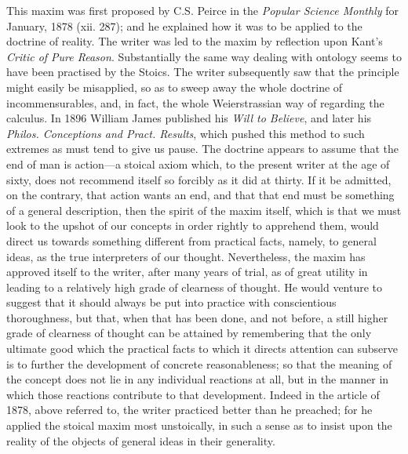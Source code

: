 \documentclass{article}
\begin{document}
This maxim was first proposed by C.S. Peirce in the \textit{Popular Science Monthly} for January, 1878 (xii. 287); and he explained how it was to be applied to the doctrine of reality. The writer was led to the maxim by reflection upon Kant's \textit{Critic of Pure Reason}. Substantially the same way dealing with ontology seems to have been practised by the Stoics. The writer subsequently saw that the principle might easily be misapplied, so as to sweep away the whole doctrine of incommensurables, and, in fact, the whole Weierstrassian way of regarding the calculus. In 1896 William James published his \textit{Will to Believe}, and later his \textit{Philos. Conceptions and Pract. Results}, which pushed this method to such extremes as must tend to give us pause. The doctrine appears to assume that the end of man is action---a stoical axiom which, to the present writer at the age of sixty, does not recommend itself so forcibly as it did at thirty. If it be admitted, on the contrary, that action wants an end, and that that end must be something of a general description, then the spirit of the maxim itself, which is that we must look to the upshot of our concepts in order rightly to apprehend them, would direct us towards something different from practical facts, namely, to general ideas, as the true interpreters of our thought. Nevertheless, the maxim has approved itself to the writer, after many years of trial, as of great utility in leading to a relatively high grade of clearness of thought. He would venture to suggest that it should always be put into practice with conscientious thoroughness, but that, when that has been done, and not before, a still higher grade of clearness of thought can be attained by remembering that the only ultimate good which the practical facts to which it directs attention can subserve is to further the development of concrete reasonableness; so that the meaning of the concept does not lie in any individual reactions at all, but in the manner in which those reactions contribute to that development. Indeed in the article of 1878, above referred to, the writer practiced better than he preached; for he applied the stoical maxim most unstoically, in such a sense as to insist upon the reality of the objects of general ideas in their generality.
\end{document}
